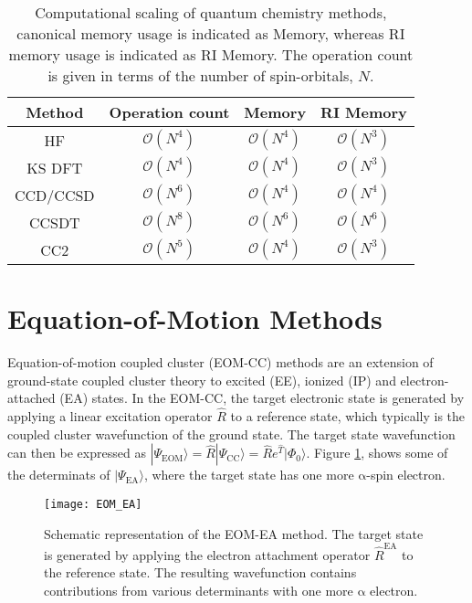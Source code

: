 \begin{table}[h!]
    \centering
    \caption[Computational Scaling of selected Methods]{Computational scaling of quantum chemistry methods, canonical memory usage is indicated as Memory, whereas RI memory usage is indicated as RI Memory. The operation count is given in terms of the number of spin-orbitals, $N$.}
    \label{tab:qc_scaling}
    \begin{tabular}{cccc}
        \toprule
        Method & Operation count & Memory & RI Memory \\
        \midrule
        HF & $\mathcal{O}(N^4)$ & $\mathcal{O}(N^4)$ & $\mathcal{O}(N^3)$ \\ 
        KS DFT & $\mathcal{O}(N^4)$ & $\mathcal{O}(N^4)$ & $\mathcal{O}(N^3)$ \\ 
        CCD/CCSD & $\mathcal{O}(N^6)$ & $\mathcal{O}(N^4)$ & $\mathcal{O}(N^4)$ \\
        CCSDT & $\mathcal{O}(N^8)$ & $\mathcal{O}(N^6)$ & $\mathcal{O}(N^6)$ \\
        CC2 & $\mathcal{O}(N^{5})$ & $\mathcal{O}(N^4)$ & $\mathcal{O}(N^3)$ \\
        \bottomrule
    \end{tabular}
\end{table}

\section{Equation-of-Motion Methods} \label{sec:eom_theory}
Equation-of-motion coupled cluster (EOM-CC) methods\cite{emrich1981extension,stanton1993equation,krylov2008equation} are an extension of ground-state coupled cluster theory to excited (EE), ionized (IP) and electron-attached (EA) states. In the EOM-CC, the target electronic state is generated by applying a linear excitation operator $\hat{R}$ to a reference state, which typically is the coupled cluster wavefunction of the ground state. The target state wavefunction can then be expressed as $|\Psi_{\mathrm{EOM}}\rangle = \hat{R} |\Psi_{\mathrm{CC}}\rangle = \hat{R} e^{\hat{T}} |\Phi_{\mathrm{0}}\rangle$. Figure \ref{fig:EOM}, shows some of the determinats of $| \Psi_{\mathrm{EA}} \rangle$, where the target state has one more $\mathrm{\alpha}$-spin electron. \\

\begin{figure}
    \centering
    \medskip
    \texttt{[image: EOM\_EA]}
    \caption[EOM-EA]{Schematic representation of the EOM-EA method. The target state is generated by applying the electron attachment operator $\hat{R}^{\mathrm{EA}}$ to the reference state. The resulting wavefunction contains contributions from various determinants with one more $\mathrm{\alpha}$ electron.}
    \label{fig:EOM}
\end{figure}

